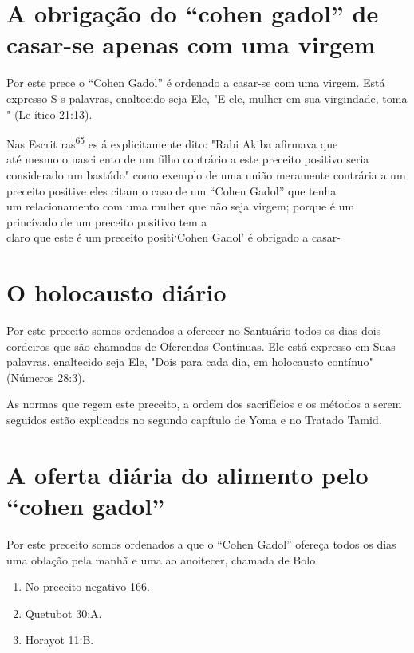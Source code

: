 \section{A obrigação do ``cohen gadol'' de casar-se apenas com uma virgem}

Por este prece o ``Cohen Gadol'' é ordenado a casar-se com uma virgem.
Está expresso S s palavras, enaltecido seja Ele, "E ele, mulher em sua
virgindade, toma " (Le ítico 21:13).


Nas Escrit ras\textsuperscript{65} es á explicitamente dito: "Rabi Akiba
afirmava que\\
até mesmo o nasci ento de um filho contrário a este preceito positivo
seria\\
considerado um bastúdo" como exemplo de uma união meramente contrária
a um preceito positive eles citam o caso de um ``Cohen Gadol'' que
tenha\\
um relacionamento com uma mulher que não seja virgem; porque é um
princívado
de um preceito positivo tem a\\
claro que este é um preceito positi`Cohen
Gadol' é obrigado a casar-


\section{O holocausto diário}

Por este preceito somos ordenados a oferecer no Santuário todos os dias
dois cordeiros que são chamados de Oferendas Contínuas. Ele está
ex­presso em Suas palavras, enaltecido seja Ele, "Dois para cada dia, em
holocaus­to contínuo" (Números 28:3).

As normas que regem este preceito, a ordem dos sacrifícios e os mé­todos
a serem seguidos estão explicados no segundo capítulo de Yoma e no
Tratado Tamid.

\section{A oferta diária do alimento pelo ``cohen gadol''}

Por este preceito somos ordenados a que o ``Cohen Gadol'' ofereça todos os
dias uma oblação pela manhã e uma ao anoitecer, chamada de Bolo


\begin{enumerate}
\def\labelenumi{\arabic{enumi}.}
\setcounter{enumi}{63}
\item
 
 No preceito negativo 166.
 
\item
 
 Quetubot 30:A.
 
\item
 
 Horayot 11:B.
 
\end{enumerate}




